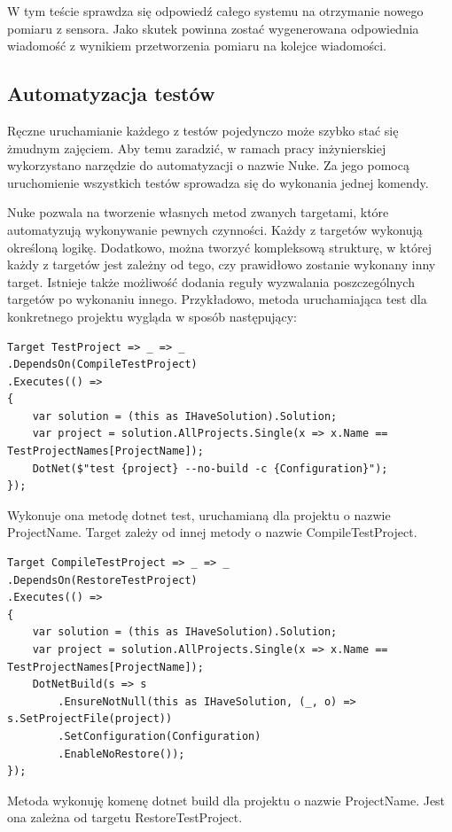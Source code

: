 \documentclass[11pt, a4]{article} %
\begin{document}
W tym teście sprawdza się odpowiedź całego systemu na otrzymanie nowego pomiaru 
z sensora. Jako skutek powinna zostać wygenerowana odpowiednia wiadomość z wynikiem 
przetworzenia pomiaru na kolejce wiadomości.

\subsection{Automatyzacja testów}

Ręczne uruchamianie każdego z testów pojedynczo może szybko stać się żmudnym zajęciem. 
Aby temu zaradzić, w ramach pracy inżynierskiej wykorzystano narzędzie do automatyzacji 
o nazwie Nuke. Za jego pomocą uruchomienie wszystkich testów sprowadza się do wykonania 
jednej komendy. 

Nuke pozwala na tworzenie własnych metod zwanych targetami, które automatyzują 
wykonywanie pewnych czynności. Każdy z targetów wykonują określoną logikę. 
Dodatkowo, można tworzyć kompleksową strukturę, w której każdy z targetów jest zależny 
od tego, czy prawidłowo zostanie wykonany inny target. Istnieje także możliwość 
dodania reguły wyzwalania poszczególnych targetów po wykonaniu innego. 
Przykładowo, metoda uruchamiająca test dla konkretnego projektu wygląda w sposób 
następujący:

\begin{lstlisting}
Target TestProject => _ => _
.DependsOn(CompileTestProject)
.Executes(() =>
{
    var solution = (this as IHaveSolution).Solution;
    var project = solution.AllProjects.Single(x => x.Name == TestProjectNames[ProjectName]);
    DotNet($"test {project} --no-build -c {Configuration}");
});
\end{lstlisting}

Wykonuje ona metodę dotnet test, uruchamianą dla projektu o nazwie ProjectName. 
Target zależy od innej metody o nazwie CompileTestProject.

\begin{lstlisting}
Target CompileTestProject => _ => _
.DependsOn(RestoreTestProject)
.Executes(() =>
{
    var solution = (this as IHaveSolution).Solution;
    var project = solution.AllProjects.Single(x => x.Name == TestProjectNames[ProjectName]);
    DotNetBuild(s => s
        .EnsureNotNull(this as IHaveSolution, (_, o) => s.SetProjectFile(project))
        .SetConfiguration(Configuration)
        .EnableNoRestore());
});
\end{lstlisting}

Metoda wykonuję komenę dotnet build dla projektu o nazwie ProjectName. Jest ona 
zależna od targetu RestoreTestProject.
\end{document}
